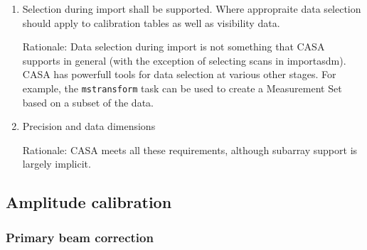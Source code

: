 \documentclass[11pt,a4paper]{article}
\begin{document}
\begin{enumerate}[subseclist]

\item Selection during import shall be supported.  Where appropraite
  data selection should apply to calibration tables as well as
  visibility data.

  Rationale: Data selection during import is not something that CASA
  supports in general (with the exception of selecting scans in
  importasdm).  CASA has powerfull tools for data selection at various
  other stages.  For example, the \texttt{mstransform} task can be
  used to create a Measurement Set based on a subset of the data.

\item Precision and data dimensions

  Rationale: CASA meets all these requirements, although subarray
  support is largely implicit.

\end{enumerate}

\subsection{Amplitude calibration}

\subsubsection{Primary beam correction}
\end{document}
